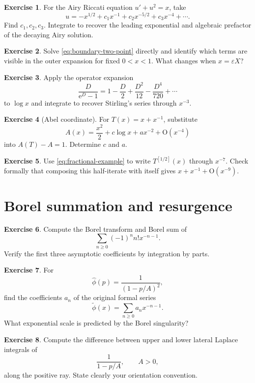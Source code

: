 \documentclass[11pt,openany]{book}
\theoremstyle{plain}
\theoremstyle{definition}
\newtheorem{exercise}{Exercise}[chapter]
\theoremstyle{remark}
\newcommand{\bigO}{\mathrm{O}}
\newcommand{\e}{\mathrm{e}}
\begin{document}
\begin{exercise}
For the Airy Riccati equation $u'+u^2=x$, take
\[
  u=-x^{1/2}+c_1x^{-1}+c_2x^{-5/2}+c_3x^{-4}+\cdots.
\]
Find $c_1,c_2,c_3$. Integrate to recover the leading exponential and algebraic prefactor of the decaying Airy solution.
\end{exercise}

\begin{exercise}
Solve \cref{eq:boundary-two-point} directly and identify which terms are visible in the outer expansion for fixed $0<x<1$. What changes when $x=\varepsilon X$?
\end{exercise}

\begin{exercise}
Apply the operator expansion
\[
  \frac{D}{\e^D-1}=1-\frac D2+\frac{D^2}{12}
  -\frac{D^4}{720}+\cdots
\]
to $\log x$ and integrate to recover Stirling's series through $x^{-3}$.
\end{exercise}

\begin{exercise}[Abel coordinate]
For $T(x)=x+x^{-1}$, substitute
\[
 A(x)=\frac{x^2}{2}+c\log x+a x^{-2}+\bigO(x^{-4})
\]
into $A(T)-A=1$. Determine $c$ and $a$.
\end{exercise}

\begin{exercise}
Use \cref{eq:fractional-example} to write $T^{[1/2]}(x)$ through $x^{-7}$. Check formally that composing this half-iterate with itself gives $x+x^{-1}+\bigO(x^{-9})$.
\end{exercise}

\section{Borel summation and resurgence}

\begin{exercise}
Compute the Borel transform and Borel sum of
\[
  \sum_{n\ge0}(-1)^n n!x^{-n-1}.
\]
Verify the first three asymptotic coefficients by integration by parts.
\end{exercise}

\begin{exercise}
For
\[
  \widehat\phi(p)=\frac{1}{(1-p/A)^2},
\]
find the coefficients $a_n$ of the original formal series
\[
  \widetilde\phi(x)=\sum_{n\ge0}a_nx^{-n-1}.
\]
What exponential scale is predicted by the Borel singularity?
\end{exercise}

\begin{exercise}
Compute the difference between upper and lower lateral Laplace integrals of
\[
  \frac{1}{1-p/A},
  \qquad A>0,
\]
along the positive ray. State clearly your orientation convention.
\end{exercise}
\end{document}
